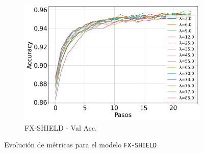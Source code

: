 \begin{figure}[H]
\begin{subfigure}[b]{0.3\textwidth}
        \includegraphics[width=\linewidth]{images/Val_Accuracy_evolucion_fxshield.png}
        \caption{FX-SHIELD - Val Acc.}
    \end{subfigure}

    \caption{Evolución de métricas para el modelo \texttt{FX-SHIELD}}
    \label{fig:metrics_fxshield}
\end{figure}

